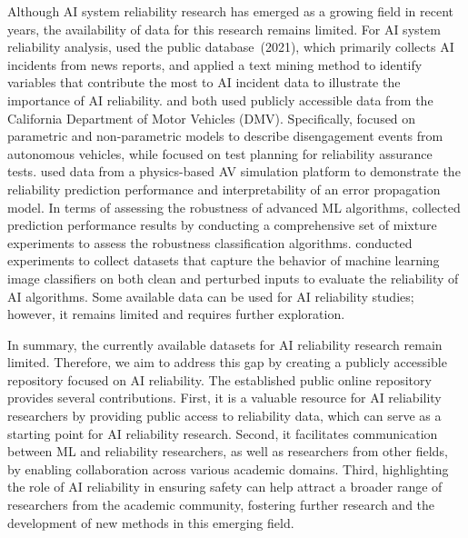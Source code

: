 Although AI system reliability research has emerged as a growing field in recent years, the availability of data for this research remains limited. For AI system reliability analysis,  used the public  database~(2021), which primarily collects AI incidents from news reports, and applied a text mining method to identify variables that contribute the most to AI incident data to illustrate the importance of AI reliability.  and  both used publicly accessible data from the California Department of Motor Vehicles (DMV). Specifically,  focused on parametric and non-parametric models to describe disengagement events from autonomous vehicles, while  focused on test planning for reliability assurance tests.  used data from a physics-based AV simulation platform to demonstrate the reliability prediction performance and interpretability of an error propagation model. In terms of assessing the robustness of advanced ML algorithms,  collected prediction performance results by conducting a comprehensive set of mixture experiments to assess the robustness classification algorithms.  conducted experiments to collect datasets that capture the behavior of machine learning image classifiers on both clean and perturbed inputs to evaluate the reliability of AI algorithms. Some available data can be used for AI reliability studies; however, it remains limited and requires further exploration.


In summary, the currently available datasets for AI reliability research remain limited. Therefore, we aim to address this gap by creating a publicly accessible repository focused on AI reliability. The established public online repository provides several contributions. First, it is a valuable resource for AI reliability researchers by providing public access to reliability data, which can serve as a starting point for AI reliability research. Second, it facilitates communication between ML and reliability researchers, as well as researchers from other fields, by enabling collaboration across various academic domains. Third, highlighting the role of AI reliability in ensuring safety can help attract a broader range of researchers from the academic community, fostering further research and the development of new methods in this emerging field.



